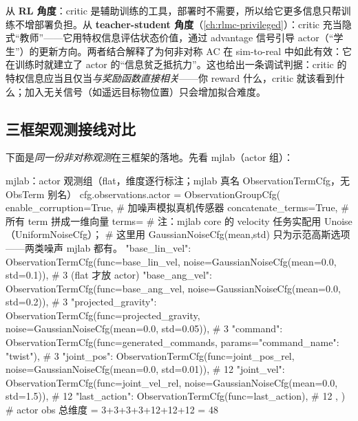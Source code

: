 \begin{insight}\label{ins:rlmc-ql-asym}
从 \textbf{RL 角度}：critic 是辅助训练的工具，部署时不需要，所以给它更多信息只帮训练不增部署负担。从 \textbf{teacher-student 角度}（\cref{ch:rlmc-privileged}）：critic 充当隐式“教师”——它用特权信息评估状态价值，通过 advantage 信号引导 actor（“学生”）的更新方向。两者结合解释了为何非对称 AC 在 sim-to-real 中如此有效：它在训练时就建立了 actor 的“信息贫乏抵抗力”。这也给出一条调试判据：critic 的特权信息应当且仅当\emph{与奖励函数直接相关}——你 reward 什么，critic 就该看到什么；加入无关信号（如遥远目标物位置）只会增加拟合难度。
\end{insight}

\subsection{三框架观测接线对比}
\label{sec:rlmc-ql-obs-config}

下面是\emph{同一份非对称观测}在三框架的落地。先看 mjlab（actor 组）：

\begin{codebox}[Python]{mjlab：actor 观测组（flat，维度逐行标注；mjlab 真名 ObservationTermCfg，无 ObsTerm 别名）}
cfg.observations.actor = ObservationGroupCfg(
    enable_corruption=True,    # 加噪声模拟真机传感器
    concatenate_terms=True,    # 所有 term 拼成一维向量
    terms={
        # 注：mjlab core 的 velocity 任务实配用 Unoise（UniformNoiseCfg）；
        #     这里用 GaussianNoiseCfg(mean,std) 只为示范高斯选项——两类噪声 mjlab 都有。
        "base_lin_vel":      ObservationTermCfg(func=base_lin_vel,
                                     noise=GaussianNoiseCfg(mean=0.0, std=0.1)),   # 3 (flat 才放 actor)
        "base_ang_vel":      ObservationTermCfg(func=base_ang_vel,
                                     noise=GaussianNoiseCfg(mean=0.0, std=0.2)),   # 3
        "projected_gravity": ObservationTermCfg(func=projected_gravity,
                                     noise=GaussianNoiseCfg(mean=0.0, std=0.05)),  # 3
        "command":           ObservationTermCfg(func=generated_commands,
                                     params={"command_name": "twist"}),            # 3
        "joint_pos":         ObservationTermCfg(func=joint_pos_rel,
                                     noise=GaussianNoiseCfg(mean=0.0, std=0.01)),  # 12
        "joint_vel":         ObservationTermCfg(func=joint_vel_rel,
                                     noise=GaussianNoiseCfg(mean=0.0, std=1.5)),   # 12
        "last_action":       ObservationTermCfg(func=last_action),                 # 12
    },
)   # actor obs 总维度 = 3+3+3+3+12+12+12 = 48
\end{codebox}

